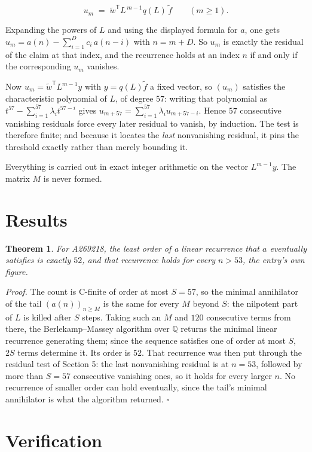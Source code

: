 \documentclass[11pt]{article}
\newtheorem{theorem}{Theorem}
\theoremstyle{definition}
\begin{document}
\[u_m \;=\; \tilde w^{\mathsf T} L^{\,m-1} q(L)\,\tilde f \qquad (m \ge 1).\]

Expanding the powers of $L$ and using the displayed formula for $a$, one gets $u_m = a(n) - \sum_{i=1}^{D} c_i\,a(n-i)$ with $n = m + D$. So $u_m$ is exactly the residual of the claim at that index, and the recurrence holds at an index $n$ if and only if the corresponding $u_m$ vanishes.

Now $u_m = \tilde w^{\mathsf T} L^{m-1} y$ with $y = q(L)\tilde f$ a fixed vector, so $(u_m)$ satisfies the characteristic polynomial of $L$, of degree $57$: writing that polynomial as $t^{57} - \sum_{i=1}^{57} \lambda_i t^{57-i}$ gives $u_{m+57} = \sum_{i=1}^{57} \lambda_i u_{m+57-i}$. Hence $57$ consecutive vanishing residuals force every later residual to vanish, by induction. The test is therefore finite; and because it locates the {\itshape last} nonvanishing residual, it pins the threshold exactly rather than merely bounding it.

Everything is carried out in exact integer arithmetic on the vector $L^{m-1}y$. The matrix $M$ is never formed.

\section{Results}

\begin{theorem} For A269218, the least order of a linear recurrence that $a$ eventually satisfies is exactly $52$, and that recurrence holds for every $n > 53$, the entry's own figure.\end{theorem}

{\itshape Proof.} The count is C-finite of order at most $S = 57$, so the minimal annihilator of the tail $(a(n))_{n \ge M}$ is the same for every $M$ beyond $S$: the nilpotent part of $L$ is killed after $S$ steps. Taking such an $M$ and $120$ consecutive terms from there, the Berlekamp--Massey algorithm over $\mathbb{Q}$ returns the minimal linear recurrence generating them; since the sequence satisfies one of order at most $S$, $2S$ terms determine it. Its order is $52$. That recurrence was then put through the residual test of Section 5: the last nonvanishing residual is at $n = 53$, followed by more than $S = 57$ consecutive vanishing ones, so it holds for every larger $n$. No recurrence of smaller order can hold eventually, since the tail's minimal annihilator is what the algorithm returned. $\square$

\section{Verification}
\end{document}
